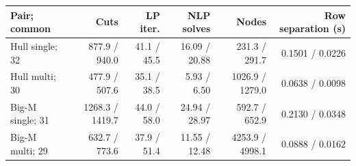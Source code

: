 \begin{tabular}{lrrrrr}
\toprule
Pair; common & Cuts & LP iter. & NLP solves & Nodes & Row separation (s) \\
\midrule
Hull single; 32 & 877.9 / 940.0 & 41.1 / 45.5 & 16.09 / 20.88 & 231.3 / 291.7 & 0.1501 / 0.0226 \\
Hull multi; 30 & 477.9 / 507.6 & 35.1 / 38.5 & 5.93 / 6.50 & 1026.9 / 1279.0 & 0.0638 / 0.0098 \\
Big-M single; 31 & 1268.3 / 1419.7 & 44.0 / 58.0 & 24.94 / 28.97 & 592.7 / 652.9 & 0.2130 / 0.0348 \\
Big-M multi; 29 & 632.7 / 773.6 & 37.9 / 51.4 & 11.55 / 12.48 & 4253.9 / 4998.1 & 0.0888 / 0.0162 \\
\bottomrule
\end{tabular}
